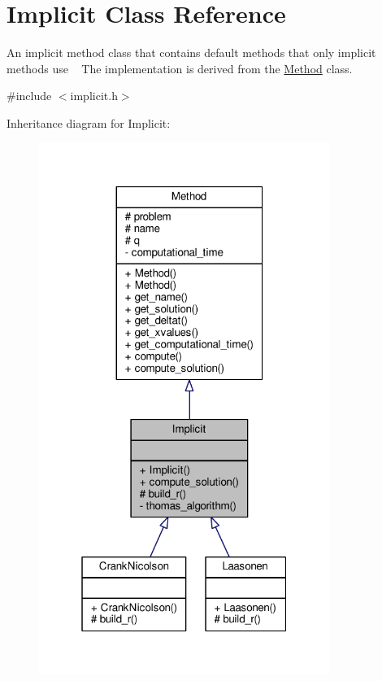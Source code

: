 \hypertarget{classImplicit}{}\section{Implicit Class Reference}
\label{classImplicit}


An implicit method class that contains default methods that only implicit methods use ~\newline
 The implementation is derived from the \hyperlink{classMethod}{Method} class.  




{\ttfamily \#include $<$implicit.\+h$>$}



Inheritance diagram for Implicit\+:
\nopagebreak
\begin{figure}[H]
\begin{center}
\leavevmode
\includegraphics[width=268pt]{classImplicit__inherit__graph}
\end{center}
\end{figure}



